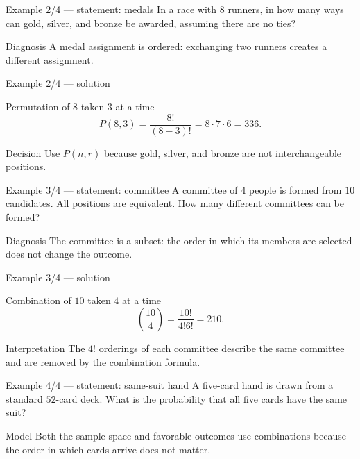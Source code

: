 \documentclass[10pt,aspectratio=169]{beamer}
\begin{document}
\begin{frame}{Example 2/4 --- statement: medals}
  \small
  In a race with $8$ runners, in how many ways can gold, silver, and bronze be
  awarded, assuming there are no ties?
  \vfill
  \begin{alertblock}{Diagnosis}
    A medal assignment is ordered: exchanging two runners creates a different
    assignment.
  \end{alertblock}
\end{frame}

\begin{frame}{Example 2/4 --- solution}
  \small
  \begin{block}{Permutation of $8$ taken $3$ at a time}
    \[
      P(8,3)=\frac{8!}{(8-3)!}=8\cdot7\cdot6=336.
    \]
  \end{block}
  \begin{exampleblock}{Decision}
    Use $P(n,r)$ because gold, silver, and bronze are not interchangeable
    positions.
  \end{exampleblock}
\end{frame}

\begin{frame}{Example 3/4 --- statement: committee}
  \small
  A committee of $4$ people is formed from $10$ candidates. All positions are
  equivalent. How many different committees can be formed?
  \vfill
  \begin{alertblock}{Diagnosis}
    The committee is a subset: the order in which its members are selected
    does not change the outcome.
  \end{alertblock}
\end{frame}

\begin{frame}{Example 3/4 --- solution}
  \small
  \begin{block}{Combination of $10$ taken $4$ at a time}
    \[
      \binom{10}{4}=\frac{10!}{4!6!}=210.
    \]
  \end{block}
  \begin{exampleblock}{Interpretation}
    The $4!$ orderings of each committee describe the same committee and are
    removed by the combination formula.
  \end{exampleblock}
\end{frame}

\begin{frame}{Example 4/4 --- statement: same-suit hand}
  \small
  A five-card hand is drawn from a standard $52$-card deck. What is the
  probability that all five cards have the same suit?
  \vfill
  \begin{alertblock}{Model}
    Both the sample space and favorable outcomes use combinations because the
    order in which cards arrive does not matter.
  \end{alertblock}
\end{frame}
\end{document}
